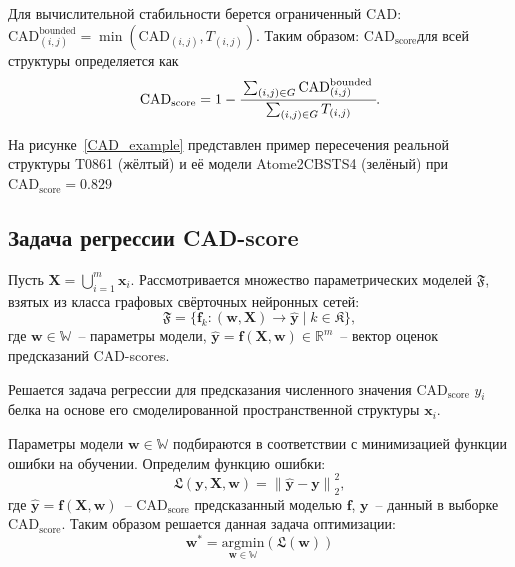 \documentclass[14pt]{extarticle}
\begin{document}
Для вычислительной стабильности берется ограниченный CAD: $\mathrm{CAD}_{(i, j)}^{\text {bounded}}=\min \left(\mathrm{CAD}_{(i, j)}, T_{(i, j)}\right)$. Таким образом:
$\text{CAD}_\text{score}$для всей структуры определяется как
\begin{align}
\mathrm{CAD}_\text{score}=1-\cfrac{\sum_{(i, j) \in G} \mathrm{CAD}_{(i, j)}^{\text {bounded }}}{\sum_{(i, j) \in G} T_{(i, j)}}.
\label{CAD_score}
\end{align}

На рисунке~\ref{CAD_example} представлен пример пересечения реальной структуры T0861 (жёлтый) и её модели Atome2\textunderscore CBS\textunderscore TS4 (зелёный) при $\mathrm{CAD}_\text{score}=0.829$

\subsection{Задача регрессии CAD-score}

Пусть $\mathbf{X} = \bigcup_{i=1}^m \mathbf{x}_i$. Рассмотривается множество параметрических моделей $\mathfrak{F}$, взятых из класса графовых свёрточных нейронных сетей: 
\[\mathfrak{F} = \{\mathbf{f}_k\colon(\mathbf{w}, \mathbf{X})\to  \mathbf{\hat{y}}\mid k \in \mathfrak{K}\},\] 
где $\mathbf{w} \in \mathbb{W}$~-- параметры модели, $\hat{\mathbf{y}} = \mathbf{f} (\mathbf{X},\mathbf{w}) \in \mathbb{R}^{m}$~-- вектор оценок предсказаний CAD-scores. 

Решается задача регрессии для предсказания численного значения $\text{CAD}_\text{score}$ $y_i$ белка на основе его смоделированной пространственной структуры $\mathbf{x}_i$.

Параметры модели $\mathbf{w}\in \mathbb{W}$ подбираются в соответствии с минимизацией функции ошибки на обучении. Определим функцию ошибки:
\[\mathfrak{L}(\mathbf{y}, \mathbf{X}, \mathbf{w}) =\left\lVert \hat{\mathbf{y}} - \mathbf{y} \right\rVert^{2}_2,\]
где $\mathbf{\hat{y}} = \mathbf{f} (\mathbf{X},\mathbf{w})$~-- $\text{CAD}_\text{score}$ предсказанный моделью $\mathbf{f}$, $\mathbf{y}$~-- данный в выборке $\text{CAD}_\text{score}$.
Таким образом решается данная задача оптимизации: 
$$\textbf{w}^* = \underset{\mathbf{w}\in\mathbb{W}}{\text{argmin}}(\mathfrak{L}(\textbf{w}))$$
\end{document}
